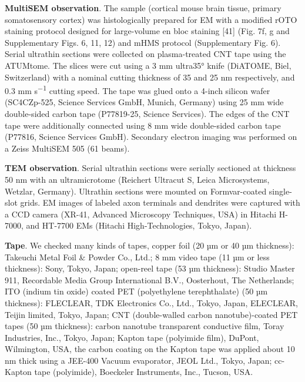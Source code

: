 \documentclass{article}
\begin{document}
\textbf{MultiSEM observation}. The sample (cortical mouse brain tissue, primary somatosensory cortex) was histologically prepared for EM with a modified rOTO staining protocol designed for large-volume en bloc staining [41] (Fig. 7f, g and Supplementary Figs. 6, 11, 12) and mHMS protocol (Supplementary Fig. 6). Serial ultrathin sections were collected on plasma-treated CNT tape using the ATUMtome. The slices were cut using a 3 mm ultra35° knife (DiATOME, Biel, Switzerland) with a nominal cutting thickness of 35 and 25 nm respectively, and 0.3 mm s\textsuperscript{−1} cutting speed. The tape was glued onto a 4-inch silicon wafer (SC4CZp-525, Science Services GmbH, Munich, Germany) using 25 mm wide double-sided carbon tape (P77819-25, Science Services). The edges of the CNT tape were additionally connected using 8 mm wide double-sided carbon tape (P77816, Science Services GmbH). Secondary electron imaging was performed on a Zeiss MultiSEM 505 (61 beams).

\textbf{TEM observation}. Serial ultrathin sections were serially sectioned at thickness 50 nm with an ultramicrotome (Reichert Ultracut S, Leica Microsystems, Wetzlar, Germany). Ultrathin sections were mounted on Formvar-coated single-slot grids. EM images of labeled axon terminals and dendrites were captured with a CCD camera (XR-41, Advanced Microscopy Techniques, USA) in Hitachi H-7000, and HT-7700 EMs (Hitachi High-Technologies, Tokyo, Japan).

\textbf{Tape}. We checked many kinds of tapes, copper foil (20 µm or 40 µm thickness): Takeuchi Metal Foil \& Powder Co., Ltd.; 8 mm video tape (11 µm or less thickness): Sony, Tokyo, Japan; open-reel tape (53 µm thickness): Studio Master 911, Recordable Media Group International B.V., Oosterhout, The Netherlands; ITO (indium tin oxide) coated PET (polyethylene terephthalate) (50 µm thickness): FLECLEAR, TDK Electronics Co., Ltd., Tokyo, Japan, ELECLEAR, Teijin limited, Tokyo, Japan; CNT (double-walled carbon nanotube)-coated PET tapes (50 µm thickness): carbon nanotube transparent conductive film, Toray Industries, Inc., Tokyo, Japan; Kapton tape (polyimide film), DuPont, Wilmington, USA, the carbon coating on the Kapton tape was applied about 10 nm thick using a JEE-400 Vacuum evaporator, JEOL Ltd., Tokyo, Japan; cc-Kapton tape (polyimide), Boeckeler Instruments, Inc., Tucson, USA.
\end{document}
